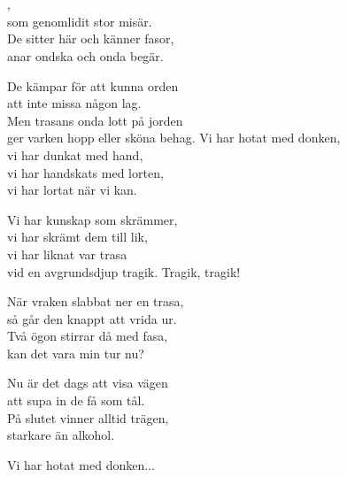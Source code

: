 \\


 \\
\author{Text: Sara von Knorring }

,\\
som genomlidit stor misär.\\
De sitter här och känner fasor,\\
anar ondska och onda begär.

De kämpar för att kunna orden\\
att inte missa någon lag.\\
Men trasans onda lott på jorden\\
ger varken hopp eller sköna behag.
\newpage
Vi har hotat med donken,\\
vi har dunkat med hand,\\
vi har handskats med lorten,\\
vi har lortat när vi kan.

Vi har kunskap som skrämmer,\\
vi har skrämt dem till lik,\\
vi har liknat var trasa\\
vid en avgrundsdjup tragik. Tragik, tragik!

När vraken slabbat ner en trasa,\\
så går den knappt att vrida ur.\\
Två ögon stirrar då med fasa,\\
kan det vara min tur nu?

Nu är det dags att visa vägen\\
att supa in de få som tål.\\
På slutet vinner alltid trägen,\\
starkare än alkohol.

Vi har hotat med donken...

\\

\newpage 


 \\       
\author{Text: Sara von Knorring }

